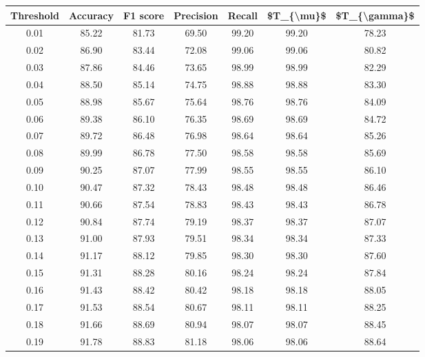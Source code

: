 \begin{tabular}{|c|c|c|c|c|c|c|}
\hline
 Threshold &  Accuracy &  F1 score &  Precision &  Recall &  \$T\_\{\textbackslash mu\}\$ &  \$T\_\{\textbackslash gamma\}\$ \\
\hline
      0.01 &     85.22 &     81.73 &      69.50 &   99.20 &      99.20 &         78.23 \\
      0.02 &     86.90 &     83.44 &      72.08 &   99.06 &      99.06 &         80.82 \\
      0.03 &     87.86 &     84.46 &      73.65 &   98.99 &      98.99 &         82.29 \\
      0.04 &     88.50 &     85.14 &      74.75 &   98.88 &      98.88 &         83.30 \\
      0.05 &     88.98 &     85.67 &      75.64 &   98.76 &      98.76 &         84.09 \\
      0.06 &     89.38 &     86.10 &      76.35 &   98.69 &      98.69 &         84.72 \\
      0.07 &     89.72 &     86.48 &      76.98 &   98.64 &      98.64 &         85.26 \\
      0.08 &     89.99 &     86.78 &      77.50 &   98.58 &      98.58 &         85.69 \\
      0.09 &     90.25 &     87.07 &      77.99 &   98.55 &      98.55 &         86.10 \\
      0.10 &     90.47 &     87.32 &      78.43 &   98.48 &      98.48 &         86.46 \\
      0.11 &     90.66 &     87.54 &      78.83 &   98.43 &      98.43 &         86.78 \\
      0.12 &     90.84 &     87.74 &      79.19 &   98.37 &      98.37 &         87.07 \\
      0.13 &     91.00 &     87.93 &      79.51 &   98.34 &      98.34 &         87.33 \\
      0.14 &     91.17 &     88.12 &      79.85 &   98.30 &      98.30 &         87.60 \\
      0.15 &     91.31 &     88.28 &      80.16 &   98.24 &      98.24 &         87.84 \\
      0.16 &     91.43 &     88.42 &      80.42 &   98.18 &      98.18 &         88.05 \\
      0.17 &     91.53 &     88.54 &      80.67 &   98.11 &      98.11 &         88.25 \\
      0.18 &     91.66 &     88.69 &      80.94 &   98.07 &      98.07 &         88.45 \\
      0.19 &     91.78 &     88.83 &      81.18 &   98.06 &      98.06 &         88.64 \\

\end{tabular}
